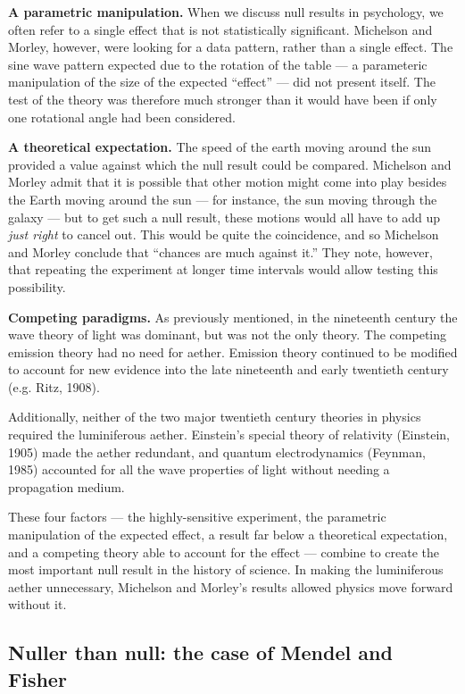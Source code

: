 \documentclass[english,floatsintext,man]{apa6}
\theoremstyle{definition}
\theoremstyle{definition}
\theoremstyle{definition}
\theoremstyle{remark}
\begin{document}
\textbf{A parametric manipulation.} When we discuss null results in
psychology, we often refer to a single effect that is not statistically
significant. Michelson and Morley, however, were looking for a data
pattern, rather than a single effect. The sine wave pattern expected due
to the rotation of the table --- a parameteric manipulation of the size
of the expected \enquote{effect} --- did not present itself. The test of
the theory was therefore much stronger than it would have been if only
one rotational angle had been considered.

\textbf{A theoretical expectation.} The speed of the earth moving around
the sun provided a value against which the null result could be
compared. Michelson and Morley admit that it is possible that other
motion might come into play besides the Earth moving around the sun ---
for instance, the sun moving through the galaxy --- but to get such a
null result, these motions would all have to add up \emph{just right} to
cancel out. This would be quite the coincidence, and so Michelson and
Morley conclude that \enquote{chances are much against it.} They note,
however, that repeating the experiment at longer time intervals would
allow testing this possibility.

\textbf{Competing paradigms.} As previously mentioned, in the nineteenth
century the wave theory of light was dominant, but was not the only
theory. The competing emission theory had no need for aether. Emission
theory continued to be modified to account for new evidence into the
late nineteenth and early twentieth century (e.g. Ritz, 1908).

Additionally, neither of the two major twentieth century theories in
physics required the luminiferous aether. Einstein's special theory of
relativity (Einstein, 1905) made the aether redundant, and quantum
electrodynamics (Feynman, 1985) accounted for all the wave properties of
light without needing a propagation medium.

These four factors --- the highly-sensitive experiment, the parametric
manipulation of the expected effect, a result far below a theoretical
expectation, and a competing theory able to account for the effect ---
combine to create the most important null result in the history of
science. In making the luminiferous aether unnecessary, Michelson and
Morley's results allowed physics move forward without it.

\hypertarget{nuller-than-null-the-case-of-mendel-and-fisher}{%
\subsection{Nuller than null: the case of Mendel and
Fisher}\label{nuller-than-null-the-case-of-mendel-and-fisher}}
\end{document}
